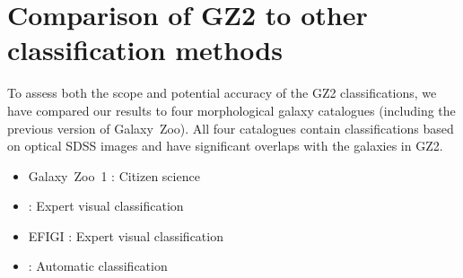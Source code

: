 \documentclass[useAMS,usenatbib]{mn2e}
\begin{document}

\section{Comparison of GZ2 to other classification methods}\label{sec-comparison}

To assess both the scope and potential accuracy of the GZ2 classifications, we have compared our results to four morphological galaxy catalogues (including the previous version of Galaxy~Zoo). All four catalogues contain classifications based on optical SDSS images and have significant overlaps with the galaxies in GZ2. 

\begin{itemize}
	\item Galaxy~Zoo~1 \citep{lin11}: Citizen science
	\item \citet{nai10} : Expert visual classification
	\item EFIGI \citep{bai11} : Expert visual classification
	\item \citet{hue11} : Automatic classification
\end{itemize}
\end{document}
